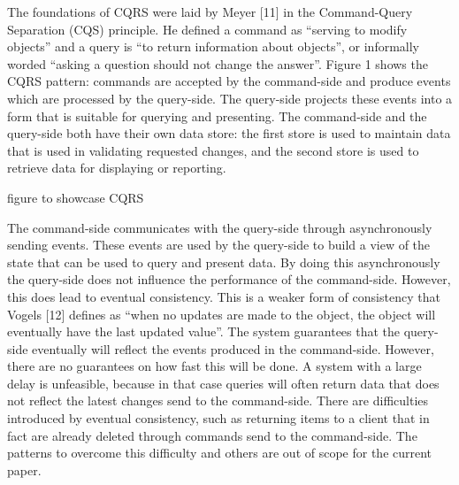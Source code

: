 The foundations of CQRS were laid by Meyer [11] in the Command-Query Separation (CQS) principle. He defined a command as “serving to modify objects” and a query is “to return information about objects”, or informally worded “asking a question should not change the answer”. Figure 1 shows the CQRS pattern: commands are accepted by the command-side and produce events which are processed by the query-side. The query-side projects these events into a form that is suitable for querying and presenting. The command-side and the query-side both have their own data store: the first store is used to maintain data that is used in validating requested changes, and the second store is used to retrieve data for displaying or reporting.

figure to showcase CQRS

The command-side communicates with the query-side through asynchronously sending events. These events are used by the query-side to build a view of the state that can be used to query and present data. By doing this asynchronously the query-side does not influence the performance of the command-side. However, this does lead to eventual consistency. This is a weaker form of consistency that Vogels [12] defines as “when no updates are made to the object, the object will eventually have the last updated value”. The system guarantees that the query-side eventually will reflect the events produced in the command-side. However, there are no guarantees on how fast this will be done. A system with a large delay is unfeasible, because in that case queries will often return data that does not reflect the latest changes send to the command-side. There are difficulties introduced by eventual consistency, such as returning items to a client that in fact are already deleted through commands send to the command-side. The patterns to overcome this difficulty and others are out of scope for the current paper.

